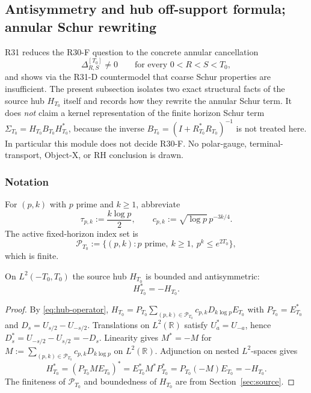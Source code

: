 
\subsection{Antisymmetry and hub off-support formula; annular Schur rewriting}
\label{subsec:o3ae-hub-off-support}

R31 reduces the R30-F question to the concrete annular cancellation
\[
 \Delta_{R,S}^{[T_0]}\ne0\qquad\text{for every }0<R<S<T_0,
\]
and shows via the R31-D countermodel that coarse Schur properties are
insufficient.  The present subsection isolates two exact structural facts of
the source hub \(H_{T_0}\) itself and records how they rewrite the annular
Schur term.  It does \emph{not} claim a kernel representation of the finite
horizon Schur term \(\Sigma_{T_0}=H_{T_0}B_{T_0}H_{T_0}^*\), because the
inverse \(B_{T_0}=(I+R_{T_0}^*R_{T_0})^{-1}\) is not treated here.  In
particular this module does not decide R30-F.  No polar-gauge,
terminal-transport, Object-X, or RH conclusion is drawn.

\subsubsection*{Notation}

For \((p,k)\) with \(p\) prime and \(k\ge1\), abbreviate
\[
 \tau_{p,k}:=\frac{k\log p}{2},\qquad
 c_{p,k}:=\sqrt{\log p}\,p^{-3k/4}.
\]
The active fixed-horizon index set is
\[
 \mathcal P_{T_0}:=\{(p,k):p\text{ prime},\ k\ge1,\ p^k\le e^{2T_0}\},
\]
which is finite.

\begin{proposition}
\label{prop:o3ae-antisymmetry}
On \(L^2(-T_0,T_0)\) the source hub \(H_{T_0}\) is bounded and antisymmetric:
\[
 \boxed{H_{T_0}^*=-H_{T_0}.}
\tag{O3AE.1}\label{eq:o3ae-antisymmetry}
\]
\end{proposition}

\begin{proof}
By \eqref{eq:hub-operator},
\(H_{T_0}=P_{T_0}\!\!\sum_{(p,k)\in\mathcal P_{T_0}}\!\!c_{p,k}D_{k\log p}E_{T_0}\)
with \(P_{T_0}=E_{T_0}^*\) and
\(D_s=U_{s/2}-U_{-s/2}\).  Translations on \(L^2(\mathbb R)\) satisfy
\(U_a^*=U_{-a}\), hence
\(D_s^*=U_{-s/2}-U_{s/2}=-D_s\).  Linearity gives
\(M^*=-M\) for
\(M:=\sum_{(p,k)\in\mathcal P_{T_0}}c_{p,k}D_{k\log p}\) on \(L^2(\mathbb R)\).
Adjunction on nested \(L^2\)-spaces gives
\[
 H_{T_0}^*
 =(P_{T_0}ME_{T_0})^*
 =E_{T_0}^*M^*P_{T_0}^*
 =P_{T_0}(-M)E_{T_0}
 =-H_{T_0}.
\]
The finiteness of \(\mathcal P_{T_0}\) and boundedness of \(H_{T_0}\) are from
Section~\ref{sec:source}.
\end{proof}

